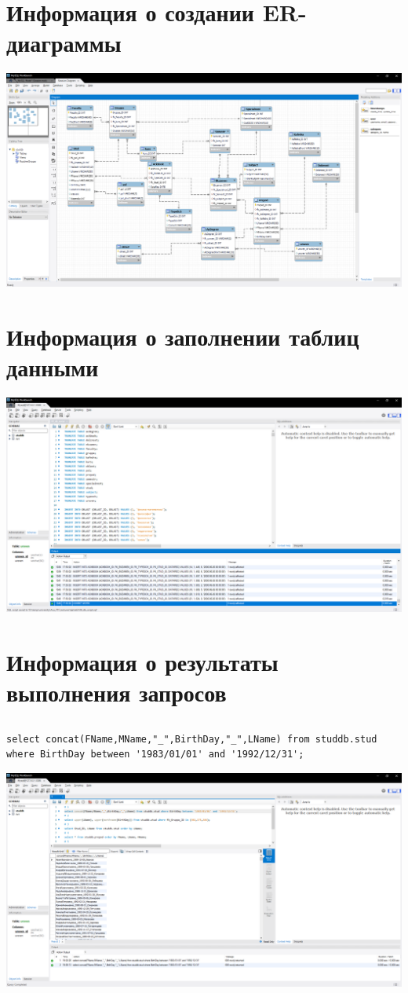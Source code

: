 \documentclass[a4paper, 12pt]{article}
\begin{document}
\newpage
\section{Информация о создании ER-диаграммы}
\includegraphics[width=\textwidth]{3.png}

\section{Информация о заполнении таблиц данными}
\includegraphics[width=\textwidth]{4.png}

\newpage
\section{Информация о результаты выполнения запросов}
\subsection{}
\begin{lstlisting}
select concat(FName,MName,"_",BirthDay,"_",LName) from studdb.stud where BirthDay between '1983/01/01' and '1992/12/31';
\end{lstlisting}
\includegraphics[width=\textwidth]{5-1.png}
\end{document}

